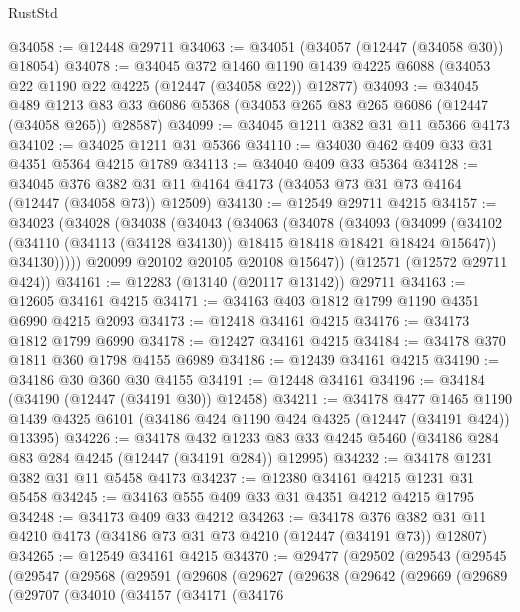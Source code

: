 \begin{lexlean}{RustStd}
\begin{coremodule}
@34058 := @12448 @29711
@34063 := @34051 (@34057 (@12447 (@34058 @30)) @18054)
@34078 := @34045
    @372
    @1460
    @1190
    @1439
    @4225
    @6088
    (@34053 @22 @1190 @22 @4225 (@12447 (@34058 @22)) @12877)
@34093 := @34045
    @489
    @1213
    @83
    @33
    @6086
    @5368
    (@34053 @265 @83 @265 @6086 (@12447 (@34058 @265)) @28587)
@34099 := @34045 @1211 @382 @31 @11 @5366 @4173
@34102 := @34025 @1211 @31 @5366
@34110 := @34030 @462 @409 @33 @31 @4351 @5364 @4215 @1789
@34113 := @34040 @409 @33 @5364
@34128 := @34045
    @376
    @382
    @31
    @11
    @4164
    @4173
    (@34053 @73 @31 @73 @4164 (@12447 (@34058 @73)) @12509)
@34130 := @12549 @29711 @4215
@34157 := @34023
    (@34028
      (@34038
        (@34043
          (@34063
            (@34078
              (@34093
                (@34099
                  (@34102 (@34110 (@34113 (@34128 @34130)) @18415 @18418 @18421 @18424 @15647))
                  @34130)))))
        @20099
        @20102
        @20105
        @20108
        @15647))
    (@12571 (@12572 @29711 @424))
@34161 := @12283 (@13140 (@20117 @13142)) @29711
@34163 := @12605 @34161 @4215
@34171 := @34163 @403 @1812 @1799 @1190 @4351 @6990 @4215 @2093
@34173 := @12418 @34161 @4215
@34176 := @34173 @1812 @1799 @6990
@34178 := @12427 @34161 @4215
@34184 := @34178 @370 @1811 @360 @1798 @4155 @6989
@34186 := @12439 @34161 @4215
@34190 := @34186 @30 @360 @30 @4155
@34191 := @12448 @34161
@34196 := @34184 (@34190 (@12447 (@34191 @30)) @12458)
@34211 := @34178
    @477
    @1465
    @1190
    @1439
    @4325
    @6101
    (@34186 @424 @1190 @424 @4325 (@12447 (@34191 @424)) @13395)
@34226 := @34178
    @432
    @1233
    @83
    @33
    @4245
    @5460
    (@34186 @284 @83 @284 @4245 (@12447 (@34191 @284)) @12995)
@34232 := @34178 @1231 @382 @31 @11 @5458 @4173
@34237 := @12380 @34161 @4215 @1231 @31 @5458
@34245 := @34163 @555 @409 @33 @31 @4351 @4212 @4215 @1795
@34248 := @34173 @409 @33 @4212
@34263 := @34178
    @376
    @382
    @31
    @11
    @4210
    @4173
    (@34186 @73 @31 @73 @4210 (@12447 (@34191 @73)) @12807)
@34265 := @12549 @34161 @4215
@34370 := @29477
    (@29502
      (@29543
        (@29545
          (@29547
            (@29568
              (@29591
                (@29608
                  (@29627
                    (@29638
                      (@29642
                        (@29669
                          (@29689
                            (@29707
                              (@34010
                                (@34157
                                  (@34171
                                    (@34176

\end{coremodule}
\end{lexlean}
